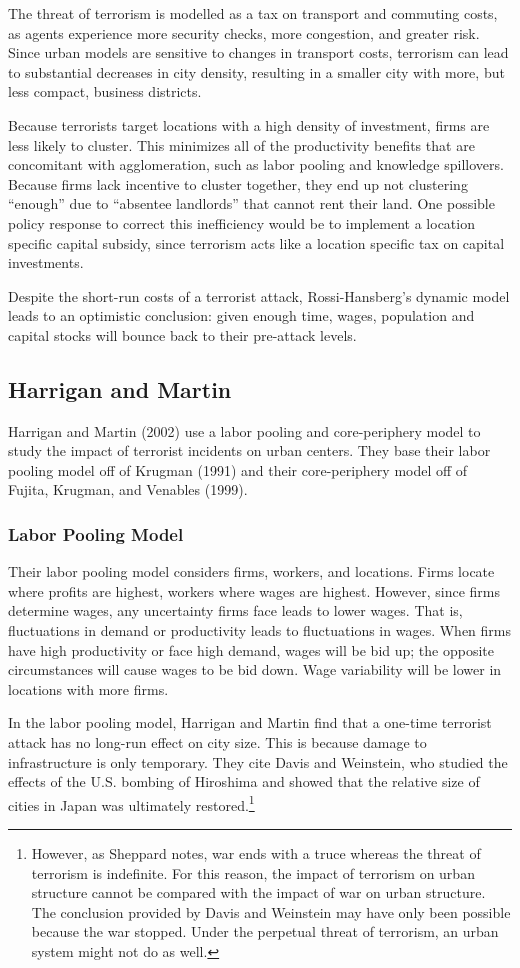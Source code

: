\documentclass[preprint,2p,12pt]{elsarticle}
\begin{document}
The threat of terrorism is modelled as a tax on transport and commuting costs, as agents experience more security checks, more congestion, and greater risk. Since urban models are sensitive to changes in transport costs, terrorism can lead to substantial decreases in city density, resulting in a smaller city with more, but less compact, business districts. 

Because terrorists target locations with a high density of investment, firms are less likely to cluster. This minimizes all of the productivity benefits that are concomitant with agglomeration, such as labor pooling and knowledge spillovers. Because firms lack incentive to cluster together, they end up not clustering ``enough'' due to ``absentee landlords'' that cannot rent their land. 
One possible policy response to correct this inefficiency would be to implement a location specific capital subsidy, since terrorism acts like a location specific tax on capital investments.

Despite the short-run costs of a terrorist attack, Rossi-Hansberg's dynamic model leads to an optimistic conclusion: given enough time, wages, population and capital stocks will bounce back to their pre-attack levels.


\subsection{\sc Harrigan and Martin}
Harrigan and Martin (2002) use a labor pooling and core-periphery model to study the impact of terrorist incidents on urban centers. They base their labor pooling model off of Krugman (1991) and their core-periphery model off of Fujita, Krugman, and Venables (1999).

\subsubsection{Labor Pooling Model}
Their labor pooling model considers firms, workers, and locations. Firms locate where profits are highest, workers where wages are highest. However, since firms determine wages, any uncertainty firms face leads to lower wages. That is, fluctuations in demand or productivity leads to fluctuations in wages. When firms have high productivity or face high demand, wages will be bid up; the opposite circumstances will cause wages to be bid down. Wage variability will be lower in locations with more firms. 

In the labor pooling model, Harrigan and Martin find that a one-time terrorist attack has no long-run effect on city size. This is because damage to infrastructure is only temporary. They cite Davis and Weinstein, who studied the effects of the U.S. bombing of Hiroshima and showed that the relative size of cities in Japan was ultimately restored.\footnote{However, as Sheppard notes, war ends with a truce whereas the threat of terrorism is indefinite. For this reason, the impact of terrorism on urban structure cannot be compared with the impact of war on urban structure. The conclusion provided by Davis and Weinstein may have only been possible because the war stopped. Under the perpetual threat of terrorism, an urban system might not do as well.}
\end{document}

